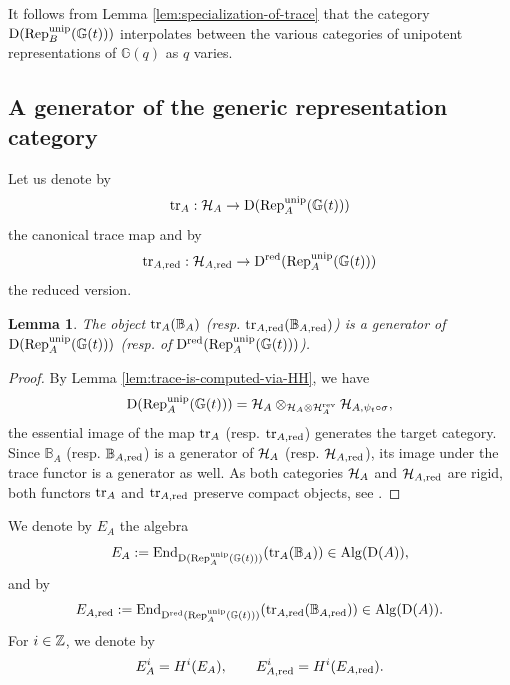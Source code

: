 \documentclass[a4paper, 10pt, oneside, reqno]{amsart}
\theoremstyle{plain}
\newtheorem{lem}[thm]{Lemma}
\theoremstyle{definition}
\theoremstyle{remark}
\newcommand{\Gbb}{\mathbb{G}}
\begin{document}
It follows from Lemma \ref{lem:specialization-of-trace} that the category  $\DD(\Rep_{B}^{\unip}(\Gbb(t)))$ interpolates between the various categories of unipotent representations of $\Gbb(q)$ as $q$ varies. 

\subsection{A generator of the generic representation category}\label{sec:generator-in-trace}

Let us denote by 
$$\tr_A : \Hcal_{A} \to \DD(\Rep_{A}^{\unip}(\Gbb(t)))$$ 
the canonical trace map and by 
$$\tr_{A,\red} : \Hcal_{A, \red} \to \DD^{\red}(\Rep_{A}^{\unip}(\Gbb(t)))$$
the reduced version. 

\begin{lem}\label{lem:generator-of-trace}
The object $\mathrm{tr}_A(\mathbb{B}_A)$ (resp. $\mathrm{tr}_{A, \mathrm{red}}(\mathbb{B}_{A, \mathrm{red}})$) is a generator of $\DD(\Rep_{A}^{\unip}(\Gbb(t)))$ (resp. of $\DD^{\red}(\Rep_{A}^{\unip}(\Gbb(t)))$).
\end{lem}

\begin{proof}
By Lemma \ref{lem:trace-is-computed-via-HH}, we have
$$\DD(\Rep_{A}^{\unip}(\Gbb(t))) = \Hcal_A \otimes_{\Hcal_{A} \otimes \Hcal_A^{\rev}} \Hcal_{A, \psi_t \circ \sigma},$$
the essential image of the map $\mathrm{tr}_A$ (resp. $\mathrm{tr}_{A,\mathrm{red}}$) generates the target category. Since $\mathbb{B}_A$ (resp. $\mathbb{B}_{A, \mathrm{red}}$) is a generator of $\mathcal{H}_A$ (resp. $\mathcal{H}_{A, \mathrm{red}}$), its image under the trace functor is a generator as well. As both categories $\mathcal{H}_{A}$ and $\mathcal{H}_{A, \mathrm{red}}$ are rigid, both functors $\mathrm{tr}_A$ and $\mathrm{tr}_{A,\mathrm{red}}$ preserve compact objects, see \cite[Example 7.90]{ZhuCategoricalTame}.
\end{proof}

We denote by $E_A$ the algebra
$$E_A := \End_{\DD(\Rep_{A}^{\unip}(\Gbb(t)))}(\tr_A(\mathbb{B}_A)) \in \Alg(\DD(A)),$$
and by 
$$E_{A, \red} := \End_{\DD^{\red}(\Rep_{A}^{\unip}(\Gbb(t)))}(\tr_{A, \red}(\mathbb{B}_{A, \red})) \in \Alg(\DD(A)).$$
For $i \in \mathbb{Z}$, we denote by 
$$E^i_{A} = H^i(E_A), \qquad E^i_{A, \mathrm{red}} = H^i(E_{A, \mathrm{red}}).$$
\end{document}
